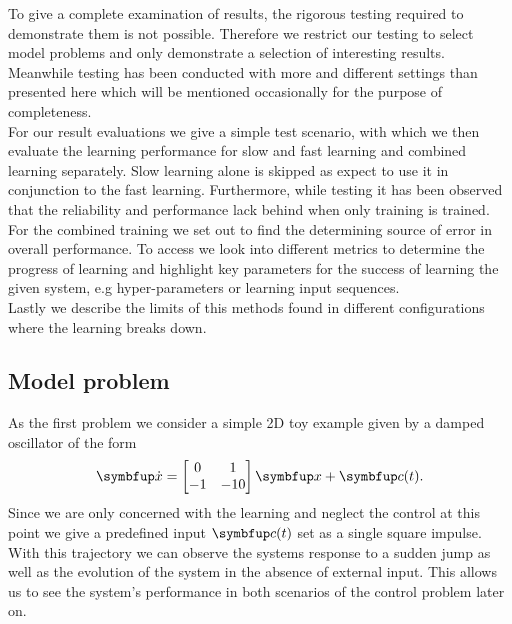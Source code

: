 To give a complete examination of results, the rigorous testing required to demonstrate them is not possible. Therefore we restrict our testing to select model problems and only demonstrate a selection of interesting results. Meanwhile testing has been conducted with more and different settings than presented here which will be mentioned occasionally for the purpose of completeness.\\
For our result evaluations we give a simple test scenario, with which we then evaluate the learning performance for slow and fast learning and combined learning separately. Slow learning alone is skipped as \cite{bourdoukan_enforcing_2015} expect to use it in conjunction to the fast learning. Furthermore, while testing it has been observed that the reliability and performance lack behind when only training is trained.\\
For the combined training we set out to find the determining  source of error in overall performance. To access we look into different metrics to determine the progress of learning and highlight key parameters for the success of learning the given system, e.g hyper-parameters or learning input sequences.\\
Lastly we describe the limits of this methods found in different configurations where the learning breaks down.

\subsection{Model problem}
As the first problem we consider a simple 2D toy example given by a damped oscillator of the form
\begin{equation}\label{eq:toy_example}
	\bmu{\dot{x}} = \begin{bmatrix}
	0&1\\ -1 &-10
	\end{bmatrix}\bmu{x} + \bmu{c}(t).
\end{equation}
Since we are only concerned with the learning and neglect the control at this point we give a predefined input $\bmu{c}(t)$ set as a single square impulse. With this trajectory we can observe the systems response to a sudden jump as well as the evolution of the system in the absence of external input. This allows us to see the system's performance in both scenarios of the control problem later on.

